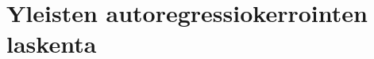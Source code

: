 \documentclass[finnish,12pt]{article}
\begin{document}


\appendix 

\clearpage
{}

\renewcommand{\theequation}{A\arabic{equation}}
\setcounter{equation}{0}  
\renewcommand{\thefigure}{A\arabic{figure}}
\setcounter{figure}{0}
\renewcommand{\thetable}{A\arabic{table}}
\setcounter{table}{0}

\section{Yleisten autoregressiokerrointen laskenta}\label{CAPZ calculation}

\end{document}
